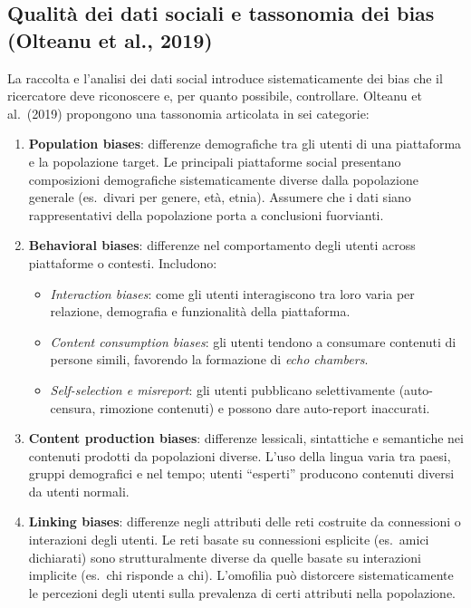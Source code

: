 \documentclass[12pt,a4paper]{article}
\begin{document}
\subsection{Qualità dei dati sociali e tassonomia dei bias (Olteanu et al., 2019)}

La raccolta e l'analisi dei dati social introduce sistematicamente dei bias che il
ricercatore deve riconoscere e, per quanto possibile, controllare. Olteanu et al.\ (2019)
propongono una tassonomia articolata in sei categorie:

\begin{enumerate}
  \item \textbf{Population biases}: differenze demografiche tra gli utenti di una piattaforma
        e la popolazione target. Le principali piattaforme social presentano composizioni
        demografiche sistematicamente diverse dalla popolazione generale (es.\ divari per
        genere, età, etnia). Assumere che i dati siano rappresentativi della popolazione
        porta a conclusioni fuorvianti.

  \item \textbf{Behavioral biases}: differenze nel comportamento degli utenti across
        piattaforme o contesti. Includono:
        \begin{itemize}
          \item \textit{Interaction biases}: come gli utenti interagiscono tra loro varia per
                relazione, demografia e funzionalità della piattaforma.
          \item \textit{Content consumption biases}: gli utenti tendono a consumare contenuti
                di persone simili, favorendo la formazione di \textit{echo chambers}.
          \item \textit{Self-selection e misreport}: gli utenti pubblicano selettivamente
                (auto-censura, rimozione contenuti) e possono dare auto-report inaccurati.
        \end{itemize}

  \item \textbf{Content production biases}: differenze lessicali, sintattiche e semantiche
        nei contenuti prodotti da popolazioni diverse. L'uso della lingua varia tra paesi,
        gruppi demografici e nel tempo; utenti ``esperti'' producono contenuti diversi da
        utenti normali.

  \item \textbf{Linking biases}: differenze negli attributi delle reti costruite da
        connessioni o interazioni degli utenti. Le reti basate su connessioni esplicite
        (es.\ amici dichiarati) sono strutturalmente diverse da quelle basate su interazioni
        implicite (es.\ chi risponde a chi). L'omofilia può distorcere sistematicamente
        le percezioni degli utenti sulla prevalenza di certi attributi nella popolazione.


\end{enumerate}
\end{document}
